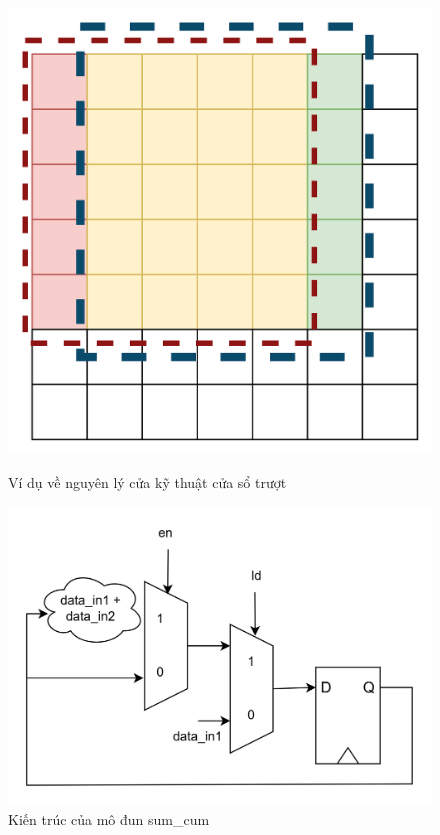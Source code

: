 \begin{figure}[!ht]
	\centering
	\begin{minipage}[t]{0.48\linewidth}
		\centering
		\includegraphics[width=\linewidth]{figures/slidingWindowPrincipla.png}
		\caption{Ví dụ về nguyên lý cửa kỹ thuật cửa sổ trượt}
		\label{fig:slidingWindowPrincipla}
	\end{minipage}
	\hfill
	\begin{minipage}[t]{0.48\linewidth}
		\centering
		\includegraphics[width=\linewidth]{figures/sumCumRTL.png}
		\caption{Kiến trúc của mô đun sum\_cum}
		\label{fig:sumCumRTL}
	\end{minipage}
\end{figure}



